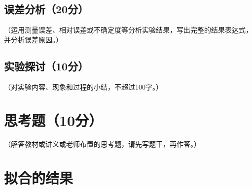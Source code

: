 \documentclass[]{../template/Report}%
\begin{document}
\begin{fullreportonly}
\subsection{误差分析（20分）}
（运用测量误差、相对误差或不确定度等分析实验结果，写出完整的结果表达式，并分析误差原因。）

\subsection{实验探讨（10分）}
（对实验内容、现象和过程的小结，不超过100字。）

\section{思考题（10分）}
（解答教材或讲义或老师布置的思考题，请先写题干，再作答。）

\end{fullreportonly}
\insertnotes
\clearpage
\appendix
\section{拟合的结果}\label{res}

\end{document}
